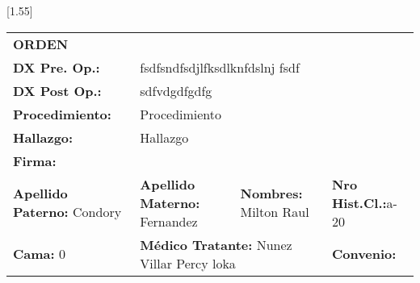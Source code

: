 \documentclass[10pt,a4paper]{article}
\begin{document}
\vspace{0.5cm}
\scalebox{1.4}[1.55]{
\begin{tabular}{|p{2.8cm}|p{2.8cm}p{2.8cm}p{2.8cm}|}
\hline
\textbf{ORDEN} & \multicolumn{3}{|l|}{}\\
\textbf{DX Pre. Op.: }&\multicolumn{3}{l|}{\begin{minipage}[t]{9 cm}\scriptsize{fsdfsndfsdjlfksdlknfdslnj	fsdf}\end{minipage}}\\
\textbf{DX Post Op.: }&\multicolumn{3}{l|}{\begin{minipage}[t]{9 cm}\scriptsize{sdfvdgdfgdfg					}\end{minipage}}\\
\textbf{Procedimiento: }&\multicolumn{3}{l|}{\begin{minipage}[t]{9 cm}\scriptsize{Procedimiento	}\end{minipage}}\\
\textbf{Hallazgo: }&\multicolumn{3}{l|}{\begin{minipage}[t]{9 cm}\scriptsize{Hallazgo}\end{minipage}}\\
\textbf{Firma: }&\multicolumn{3}{l|}{\begin{minipage}[t]{9 cm}\scriptsize{}\end{minipage}}\\
\hline
\scriptsize{\textbf{Apellido Paterno: }Condory} &\scriptsize{\textbf{Apellido Materno: }Fernandez}&\scriptsize{\textbf{Nombres: }Milton Raul}&\scriptsize{\textbf{Nro Hist.Cl.:}a-20}\\
\hline
\scriptsize{\textbf{Cama: }0}& \multicolumn{2}{l}{\begin{minipage}[t]{5.5 cm}\scriptsize{\textbf{M\'edico Tratante: }Nunez Villar Percy loka}\end{minipage}} &\scriptsize{\textbf{Convenio: }}\\

\hline
\end{tabular}}
\end{document}
